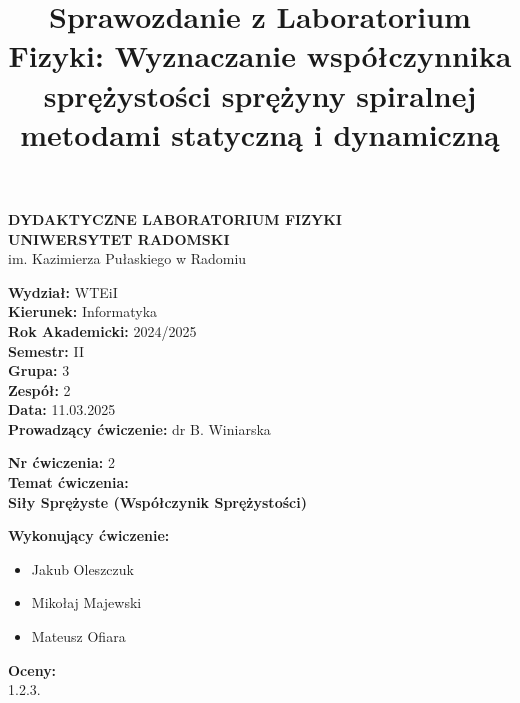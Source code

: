 \documentclass[12pt]{article}
\title{Sprawozdanie z Laboratorium Fizyki: Wyznaczanie współczynnika sprężystości sprężyny spiralnej metodami statyczną i dynamiczną}
\date{}
\begin{document}
\begin{titlepage}
    \centering
    \Large
    \textbf{DYDAKTYCZNE LABORATORIUM FIZYKI} \\
    \vspace{0.2cm}
    \textbf{UNIWERSYTET RADOMSKI}\\
    im. Kazimierza Pułaskiego w Radomiu \\
    
    \vspace{1.5cm}
    \begin{flushleft}
        \textbf{Wydział:} {WTEiI} \\
        \textbf{Kierunek:} Informatyka \\
        \textbf{Rok Akademicki:} 2024/2025 \\
        \textbf{Semestr:} II \\
        \textbf{Grupa:} 3 \\
        \textbf{Zespół:} 2 \\
        \textbf{Data:} 11.03.2025 \\
        \textbf{Prowadzący ćwiczenie:} dr B. Winiarska \\
    \end{flushleft}
    
    \vspace{1cm}
    \begin{flushleft}
        \textbf{Nr ćwiczenia:} 2 \\
        \textbf{Temat ćwiczenia:} \\
        \textbf{Siły Sprężyste (Współczynik Sprężystości)} \\
    \end{flushleft}
    
    \vspace{1cm}
    \begin{flushleft}
        \textbf{Wykonujący ćwiczenie:}
        \begin{itemize}
            \item Jakub Oleszczuk
            \item Mikołaj Majewski
            \item Mateusz Ofiara
        \end{itemize}
    \end{flushleft}

    \vfill
    \begin{flushleft}
        \textbf{Oceny:} \\
        1.\hspace{2cm}2.\hspace{2cm}3.
    \end{flushleft}
\end{titlepage}
\end{document}
